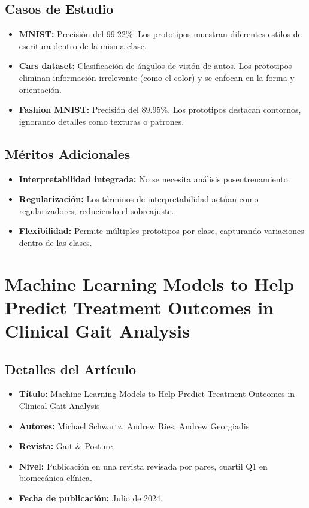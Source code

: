 \documentclass{report}
\begin{document}
    \subsection{Casos de Estudio}
    \begin{itemize}
        \item \textbf{MNIST:} Precisión del 99.22\%. Los prototipos muestran diferentes estilos de escritura dentro de la misma clase.
        \item \textbf{Cars dataset:} Clasificación de ángulos de visión de autos. Los prototipos eliminan información irrelevante (como el color) y se enfocan en la forma y orientación.
        \item \textbf{Fashion MNIST:} Precisión del 89.95\%. Los prototipos destacan contornos, ignorando detalles como texturas o patrones.
    \end{itemize}

    \subsection{Méritos Adicionales}
    \begin{itemize}
        \item \textbf{Interpretabilidad integrada:} No se necesita análisis posentrenamiento.
        \item \textbf{Regularización:} Los términos de interpretabilidad actúan como regularizadores, reduciendo el sobreajuste.
        \item \textbf{Flexibilidad:} Permite múltiples prototipos por clase, capturando variaciones dentro de las clases.
    \end{itemize}


\section{Machine Learning Models to Help Predict Treatment Outcomes in Clinical Gait Analysis}

\subsection{Detalles del Artículo}
\begin{itemize}
    \item \textbf{Título:} Machine Learning Models to Help Predict Treatment Outcomes in Clinical Gait Analysis
    \item \textbf{Autores:} Michael Schwartz, Andrew Ries, Andrew Georgiadis
    \item \textbf{Revista:} Gait \& Posture
    \item \textbf{Nivel:} Publicación en una revista revisada por pares, cuartil Q1 en biomecánica clínica.
    \item \textbf{Fecha de publicación:} Julio de 2024.
\end{itemize}
\end{document}
